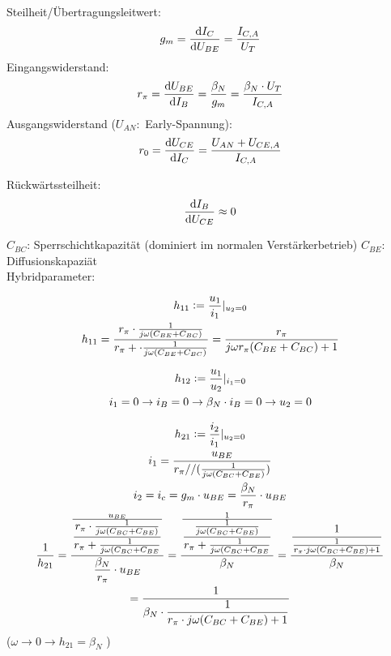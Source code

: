 \noindent Steilheit/Übertragungsleitwert:
\[ g_m = \frac{\mathop{}\!\mathrm{d} I_{C}}{\mathop{}\!\mathrm{d} U_{BE}} = \frac{I_{C,A}}{U_T} \]
Eingangswiderstand:
\[ r_\pi = \frac{\mathop{}\!\mathrm{d} U_{BE}}{\mathop{}\!\mathrm{d} I_B} = \frac{\beta_N}{g_m}= \frac{\beta_N \cdot U_T}{I_{C,A}} \]
Ausgangswiderstand ($U_{AN}:$ Early-Spannung):
\[r_0 = \frac{\mathop{}\!\mathrm{d} U_{CE}}{\mathop{}\!\mathrm{d} I_C} = \frac{U_{AN} + U_{CE,A}}{I_{C,A}}\]

\noindent Rückwärtssteilheit:
\[ \frac{\mathop{}\!\mathrm{d} I_B}{\mathop{}\!\mathrm{d} U_{CE}} \approx 0\]

\noindent $C_{BC}$: Sperrschichtkapazität (dominiert im normalen Verstärkerbetrieb)
\noindent $C_{BE}$: Diffusionskapaziät \\

\noindent Hybridparameter:

\begin{gather*}
  h_{11} \vcentcolon= \frac{u_1}{i_1}\rvert_{u_2=0}\\
  h_{11} = \frac{r_\pi \cdot \frac{1}{j\omega(C_{BE} + C_{BC})}}{r_\pi + \cdot
    \frac{1}{j\omega(C_{BE} + C_{BC})}} = \frac{r_\pi}{j\omega r_\pi
    (C_{BE}+C_{BC}) + 1}
\end{gather*}


\begin{gather*}
  h_{12} \vcentcolon= \frac{u_1}{u_2}\rvert_{i_1=0}\\
  i_1=0 \rightarrow i_B = 0 \rightarrow \beta_N \cdot i_B = 0 \rightarrow u_2 =
  0\\
\end{gather*}


\begin{gather*}
  h_{21} \vcentcolon= \frac{i_2}{i_1}\rvert_{u_2=0}\\
  i_1 = \frac{u_{BE}}{r_\pi//(\frac{1}{j\omega(C_{BC}+C_{BE})})}\\
  i_2 = i_c = g_m \cdot u_{BE} = \frac{\beta_N}{r_\pi}\cdot u_{BE}\\
  \frac{1}{h_{21}} = \dfrac{\frac{u_{BE}}{\dfrac{r_\pi \cdot
      \frac{1}{j\omega(C_{BC}+C_{BE})}}{r_\pi +
      \frac{1}{j\omega(C_{BC}+C_{BE}}}} } { \dfrac{\beta_N}{r_\pi} \cdot u_{BE}}
 = \dfrac{\frac{1}{\dfrac{
      \frac{1}{j\omega(C_{BC}+C_{BE})}}{r_\pi +
      \frac{1}{j\omega(C_{BC}+C_{BE}}}} } { \beta_N }
 = \dfrac{\dfrac{
     1}{\frac{1}{r_\pi \cdot j\omega(C_{BC}+C_{BE}) + 1}} } { \beta_N }\\
 = \frac{1}{\beta_N \cdot \dfrac{1}{r_\pi \cdot j\omega(C_{BC}+C_{BE})+1}}\\
\end{gather*}
\vspace{-1cm}
($\omega \rightarrow 0 \rightarrow h_{21} = \beta_N$ )

